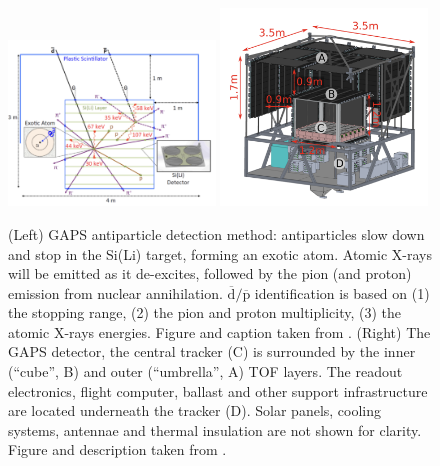\begin{figure}
    \centering
    \includegraphics[width=0.49\textwidth]{figures/GAPS_detection_technique.png}
    \includegraphics[width=0.49\textwidth]{figures/GAPS_setup.png}
    \caption{(Left) GAPS antiparticle detection method: antiparticles slow down and stop in the Si(Li) target, forming an exotic atom. Atomic X-rays will be emitted as it de-excites, followed by the pion (and proton) emission from nuclear annihilation. $\overline{\mathrm{d}}/\overline{\mathrm{p}}$ identification is based on (1) the stopping range, (2) the pion and proton multiplicity, (3) the atomic X-rays energies. Figure and caption taken from \cite{GAPS_method_Vanuccini}. (Right) The GAPS detector, the central tracker (C) is surrounded by the inner (“cube”, B) and outer (“umbrella”, A) TOF layers. The readout electronics, flight computer, ballast and other support infrastructure are located underneath the tracker (D). Solar panels, cooling systems, antennae and thermal insulation are not shown for clarity. Figure and description taken from \cite{GAPS_setup_Bird}.}
    \label{fig:GAPS_measurement_technique}
\end{figure}

